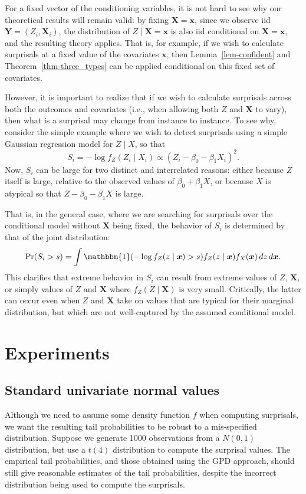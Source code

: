 \documentclass[
  12pt]{article}
\theoremstyle{definition}
\theoremstyle{plain}
\theoremstyle{plain}
\theoremstyle{plain}
\theoremstyle{remark}
\begin{document}
For a fixed vector of the conditioning variables, it is not hard to see
why our theoretical results will remain valid: by fixing
\(\bm{X}=\bm{x}\), since we observe iid \(\bm{Y}=(Z_i,\bm{X}_i)\), the
distribution of \(Z\mid \bm{X}=\bm{x}\) is also iid conditional on
\(\bm{X}=\bm{x}\), and the resulting theory applies. That is, for
example, if we wish to calculate surprisals at a fixed value of the
covariates \(\bm{x}\), then Lemma~\ref{lem-confident} and
Theorem~\ref{thm-three_types} can be applied conditional on this fixed
set of covariates.

However, it is important to realize that if we wish to calculate
surprisals across both the outcomes and covariates (i.e., when allowing
both \(Z\) and \(\bm{X}\) to vary), then what is a surprisal may change
from instance to instance. To see why, consider the simple example where
we wish to detect surprisals using a simple Gaussian regression model
for \(Z\mid X\), so that \[
S_i=-\log f_Z(Z_i\mid X_i)\propto (Z_i-\beta_0-\beta_1 X_i)^2.
\] Now, \(S_i\) can be large for two distinct and interrelated reasons:
either because \(Z\) itself is large, relative to the observed values of
\(\beta_0+\beta_1 X\), or because \(X\) is atypical so that
\(Z-\beta_0-\beta_1 X\) is large.

That is, in the general case, where we are searching for surprisals over
the conditional model without \(\bm{X}\) being fixed, the behavior of
\(S_i\) is determined by that of the joint distribution: \[
\Pr(S_i>s) = \int \mathbbm{1}(-\log f_Z(z \mid \bm{x}) > s) f_Z(z \mid \bm{x}) f_X(\bm{x})\,dz\,d\bm{x}.
\] This clarifies that extreme behavior in \(S_i\) can result from
extreme values of \(Z\), \(\bm{X}\), or simply values of \(Z\) and
\(\bm{X}\) where \(f_Z(Z\mid \bm{X})\) is very small. Critically, the
latter can occur even when \(Z\) and \(\bm{X}\) take on values that are
typical for their marginal distribution, but which are not well-captured
by the assumed conditional model.

\section{Experiments}\label{sec-experiments}

\subsection{Standard univariate normal
values}\label{standard-univariate-normal-values}

Although we need to assume some density function \(f\) when computing
surprisals, we want the resulting tail probabilities to be robust to a
mis-specified distribution. Suppose we generate 1000 observations from a
\(N(0,1)\) distribution, but use a \(t(4)\) distribution to compute the
surprisal values. The empirical tail probabilities, and those obtained
using the GPD approach, should still give reasonable estimates of the
tail probabilities, despite the incorrect distribution being used to
compute the surprisals.
\end{document}
